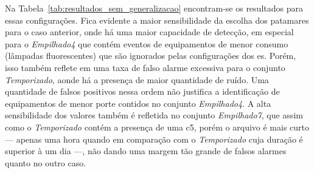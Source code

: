 \begin{table}[ht!]
\caption[Resultado para os três conjuntos de dados onde o
\acs{es} foi ajustado alimentado por todos eles.]{
Resultado para os três conjuntos de dados onde o
\acs{es} foi ajustado alimentado por todos eles. As configurações
\emph{Ajuste Manual} e \emph{Ajuste Anterior} se referem respectivamente aos casos
determinados empiricamente pelo autor do trabalho e pelo grupo do
\gls{cepel}, o último sendo determinado em dados sem ruídos.}
\label{tab:resultados_sem_generalizacao}
\end{table}


Na Tabela~\ref{tab:resultados_sem_generalizacao} encontram-se os
resultados para essas configurações. Fica evidente a maior
sensibilidade da escolha dos patamares para o caso anterior, onde há
uma maior capacidade de detecção, em especial para o \emph{Empilhado4}
que contém eventos de equipamentos de menor consumo (lâmpadas
fluorescentes) que são ignorados pelas configurações dos \acs{es}.
Porém, isso também reflete em uma taxa de falso alarme excessiva para
o conjunto \emph{Temporizado}, aonde há a presença de maior quantidade
de ruído. Uma quantidade de falsos positivos nessa ordem não justifica
a identificação de equipamentos de menor porte contidos no conjunto
\emph{Empilhado4}. A alta sensibilidade dos valores também é refletida
no conjunto \emph{Empilhado7}, que assim como o \emph{Temporizado}
contém a presença de uma \acs{c5}, porém o arquivo é mais curto ---
apenas uma hora quando em comparação com o \emph{Temporizado} cuja
duração é superior à um dia ---, não dando uma margem tão grande de
falsos alarmes quanto no outro caso.

